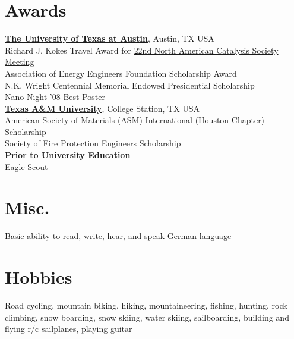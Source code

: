\documentclass[centered]{res}
\begin{document}
\begin{resume}
\section{Awards}
% 
\href{http://www.utexas.edu/}{\textbf{The University of Texas at
    Austin}}, Austin, TX USA \\
Richard J. Kokes Travel Award for
\href{http://www.22nam.org/}{22nd North American Catalysis Society
  Meeting} \\
Association of Energy Engineers Foundation Scholarship Award \\
N.K. Wright Centennial Memorial Endowed Presidential Scholarship \\
Nano Night '08 Best Poster \vspace{5pt} \\
%
\newpage{}
\href{http://www.tamu.edu/}{\textbf{Texas A\&M University}}, College
Station, TX USA \\
American Society of Materials (ASM) International (Houston Chapter)
Scholarship \\
Society of Fire Protection Engineers Scholarship \vspace{5pt} \\
%
\textbf{Prior to University Education} \\
Eagle Scout

\section{Misc.}
%
Basic ability to read, write, hear, and speak German language

\section{Hobbies}
%
Road cycling, mountain biking, hiking, mountaineering, fishing,
hunting, rock climbing, snow boarding, snow skiing, water skiing,
sailboarding, building and flying r/c sailplanes, playing guitar

\end{resume}
\end{document}
